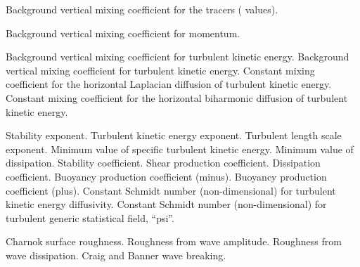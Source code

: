 \begin{klist}
    \mbox{}
     \begin{klist}
         Background vertical mixing coefficient
     for the tracers ( values).
     \end{klist}
    \mbox{}
     \begin{klist}
         Background vertical mixing coefficient 
     for momentum.
     \end{klist}
    \mbox{}
     \begin{klist}
         Background vertical mixing coefficient
     for turbulent kinetic energy.
         Background vertical mixing coefficient
     for turbulent kinetic energy.
           Constant mixing coefficient for the horizontal
     Laplacian diffusion of turbulent kinetic energy.
           Constant mixing coefficient for the horizontal
     biharmonic diffusion of turbulent kinetic energy.
     \end{klist}
   \mbox{}
     \begin{klist}
          Stability exponent.
          Turbulent kinetic energy exponent.
          Turbulent length scale exponent.
         Minimum value of specific turbulent kinetic
       energy.
         Minimum value of dissipation.
          Stability coefficient.
          Shear production coefficient.
          Dissipation coefficient.
          Buoyancy production coefficient (minus).
          Buoyancy production coefficient (plus).
        Constant Schmidt number (non-dimensional) for
       turbulent kinetic energy diffusivity.
         Constant Schmidt number (non-dimensional) for
       turbulent generic statistical field, ``psi''.
     \end{klist}
    \mbox{}
     \begin{klist}
        Charnok surface roughness.
        Roughness from wave amplitude.
        Roughness from wave dissipation.
        Craig and Banner wave breaking.
     \end{klist}
    \mbox{}

\end{klist}
